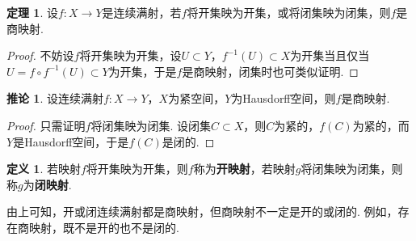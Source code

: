 \documentclass[12pt]{ctexart}
\theoremstyle{definition}
\newtheorem{definition}{定义}
\newtheorem{theorem}{定理}
\newtheorem{corollary}{推论}
\theoremstyle{plain}
\begin{document}
	\begin{theorem}
		设$f:X\to Y$是连续满射，若$f$将开集映为开集，或将闭集映为闭集，则$f$是商映射.
	\end{theorem}
	\begin{proof}
		不妨设$f$将开集映为开集，设$U\subset Y$，$f^{-1}(U)\subset X$为开集当且仅当$U=f\circ f^{-1}(U)\subset Y$为开集，于是$f$是商映射，闭集时也可类似证明.
	\end{proof}
	\begin{corollary}
		设连续满射$f:X\to Y$，$X$为紧空间，$Y$为Hausdorff空间，则$f$是商映射.
	\end{corollary}
	\begin{proof}
		只需证明$f$将闭集映为闭集. 设闭集$C\subset X$，则$C$为紧的，$f(C)$为紧的，而$Y$是Hausdorff空间，于是$f(C)$是闭的.
	\end{proof}
	\begin{definition}
		若映射$f$将开集映为开集，则$f$称为\textbf{开映射}，若映射$g$将闭集映为闭集，则称$g$为\textbf{闭映射}.
	\end{definition}
	由上可知，开或闭连续满射都是商映射，但商映射不一定是开的或闭的. 例如，存在商映射，既不是开的也不是闭的.
\end{document}
